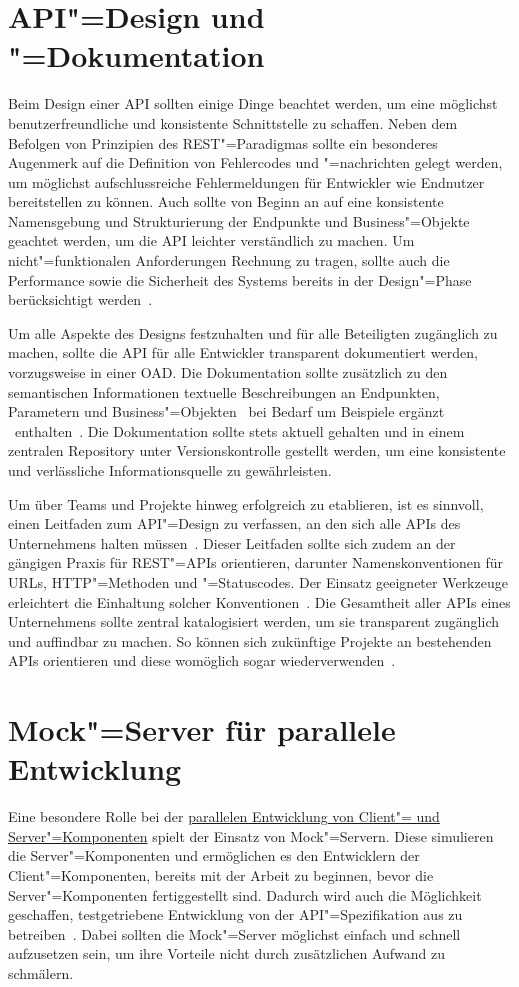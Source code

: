 \section{API"=Design und "=Dokumentation}
Beim Design einer \ac{API} sollten einige Dinge beachtet werden, um eine möglichst benutzerfreundliche und konsistente Schnittstelle zu schaffen.
Neben dem Befolgen von Prinzipien des \ac{REST}"=Paradigmas sollte ein besonderes Augenmerk auf die Definition von Fehlercodes und "=nachrichten gelegt werden, um möglichst aufschlussreiche Fehlermeldungen für Entwickler wie Endnutzer bereitstellen zu können.
Auch sollte von Beginn an auf eine konsistente Namensgebung und Strukturierung der Endpunkte und Business"=Objekte geachtet werden, um die \ac{API} leichter verständlich zu machen.
Um nicht"=funktionalen Anforderungen Rechnung zu tragen, sollte auch die Performance sowie die Sicherheit des Systems bereits in der Design"=Phase berücksichtigt werden~\cite[352\psq,354]{de23}.

Um alle Aspekte des Designs festzuhalten und für alle Beteiligten zugänglich zu machen, sollte die \ac{API} für alle Entwickler transparent dokumentiert werden, vorzugsweise in einer \ac{OAD}.
Die Dokumentation sollte zusätzlich zu den semantischen Informationen textuelle Beschreibungen an Endpunkten, Parametern und Business"=Objekten \textendash\ bei Bedarf um Beispiele ergänzt \textendash\ enthalten~\cite[353]{de23}.
Die Dokumentation sollte stets aktuell gehalten und in einem zentralen Repository unter Versionskontrolle gestellt werden, um eine konsistente und verlässliche Informationsquelle zu gewährleisten.

Um \AF über Teams und Projekte hinweg erfolgreich zu etablieren, ist es sinnvoll, einen Leitfaden zum \ac{API}"=Design zu verfassen, an den sich alle \acp{API} des Unternehmens halten müssen~\cites[3\psq]{kul23}[359]{de23}.
Dieser Leitfaden sollte sich zudem an der gängigen Praxis für \ac{REST}"=\acp{API} orientieren, darunter Namenskonventionen für \acp{URL}, \ac{HTTP}"=Methoden und "=Statuscodes.
Der Einsatz geeigneter Werkzeuge erleichtert die Einhaltung solcher Konventionen~\cite[360]{de23}.
Die Gesamtheit aller \acp{API} eines Unternehmens sollte zentral katalogisiert werden, um sie transparent zugänglich und auffindbar zu machen.
So können sich zukünftige Projekte an bestehenden \acp{API} orientieren und diese womöglich sogar wiederverwenden~\cite[3]{kul23}.

\section{Mock"=Server für parallele Entwicklung}
Eine besondere Rolle bei der \hyperref[sec:parallel-dev]{parallelen Entwicklung von Client"= und Server"=Komponenten} spielt der Einsatz von Mock"=Servern.
Diese simulieren die Server"=Komponenten und ermöglichen es den Entwicklern der Client"=Komponenten, bereits mit der Arbeit zu beginnen, bevor die Server"=Komponenten fertiggestellt sind.
Dadurch wird auch die Möglichkeit geschaffen, testgetriebene Entwicklung von der \ac{API}"=Spezifikation aus zu betreiben~\cite[353]{de23}.
Dabei sollten die Mock"=Server möglichst einfach und schnell aufzusetzen sein, um ihre Vorteile nicht durch zusätzlichen Aufwand zu schmälern.

